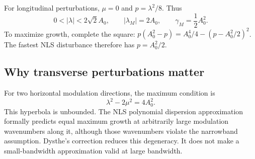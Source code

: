 For longitudinal perturbations, $\mu=0$ and $p=\lambda^2/8$. Thus
\begin{equation}\label{eq:nls-results}
 0<|\lambda|<2\sqrt2 A_0,\qquad
 |\lambda_M|=2A_0,\qquad \gamma_M=\frac12A_0^2.
\end{equation}
To maximize growth, complete the square:
$p(A_0^2-p)=A_0^4/4-(p-A_0^2/2)^2$.
The fastest NLS disturbance therefore has $p=A_0^2/2$.

\subsection{Why transverse perturbations matter}
For two horizontal modulation directions, the maximum condition is
\begin{equation}\label{eq:hyperbola}
 \lambda^2-2\mu^2=4A_0^2.
\end{equation}
This hyperbola is unbounded. The NLS polynomial dispersion approximation
formally predicts equal maximum growth at arbitrarily large modulation
wavenumbers along it, although those wavenumbers violate the narrowband
assumption. Dysthe's correction reduces this degeneracy. It does not make
a small-bandwidth approximation valid at large bandwidth.

\clearpage
